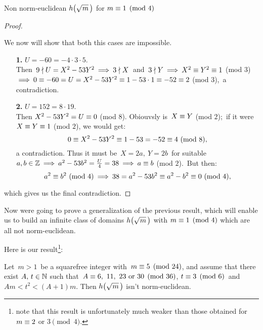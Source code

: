 \begin{subsection}{Non norm-euclidean $\hh{m}$ for $m\equiv 1 \pmod 4$}
\begin{proof}
\begin{itemize}
\end{itemize}
%
We now will show that both this cases are impossible.
%
\begin{itemize}

\item[\textbf{1. }] $U = -60 = -4 \cdot 3 \cdot 5$.\\
Then\, $9 \nmid U = X^2 - 53Y^2 \:\Longrightarrow\: 
3 \nmid X$\, and\, $3 \nmid Y \:\Longrightarrow\: X^2
\equiv Y^2 \equiv 1$ (mod $3$) $\:\Longrightarrow\: 0
\equiv -60 = U = X^2 - 53Y^2 \equiv 1 - 53 \cdot
1 \equiv -52 \equiv 2$ (mod $3$),\, a
contradiction.

\item[\textbf{2. }] $U = 152 = 8 \cdot 19$.\\
Then $X^2 - 53 Y^2 = U \equiv 0$ (mod $8$). Obiouvsly
is\, $X \equiv Y$ (mod $2$);\, if it were\,
$X \equiv Y \equiv 1$ (mod $2$), we would get:
$$
0 \equiv X^2 - 53 Y^2 \equiv 1 - 53 = -52
\equiv 4\ \mathrm{(mod\ 8)},
$$
a contradiction.
Thus it must be\, $X = 2a,\ Y = 2b$\, for suitable $a, b
\in \mathbb{Z} \:\Longrightarrow\: a^2 - 53b^2 = \frac{U}{4} = 38 \:\Longrightarrow\: a
\equiv b$ (mod $2$).\, But then:
$$
a^2 \congruent b^2\ \mathrm{(mod\ 4)} \then
38 = a^2 - 53b^2 \congruent a^2 - b^2 \congruent
0\ \mathrm{(mod\ 4)},
$$
\end{itemize}
%
which gives us the final contradiction.
%
\end{proof}

Now were going to prove a generalization of the previous result, which
will enable us to build an infinite class of domains $\hh{m}$ with
$m \equiv 1 \pmod 4$ which are all not norm-euclidean.

Here is our result\footnote{note that this result is unfortunately much
weaker than those obtained for $m \equiv 2$ or $3 \pmod 4$.}:

\begin{thm}\label{SMALL}
Let \,$m > 1$\, be a squarefree integer with \,$m \equiv 5 \pmod{24}$,
and assume that there exist $A,\, t \in \mathbb{N}$ such that\,
$A \equiv 6,~11,~23~\text{or}~30 \pmod{36}$, $t \equiv 3 \pmod 6$
\,and\, $Am < t^2 < (A+1)m$.
Then $\hh{m}$ isn't norm-euclidean.
\end{thm}


\end{subsection}
